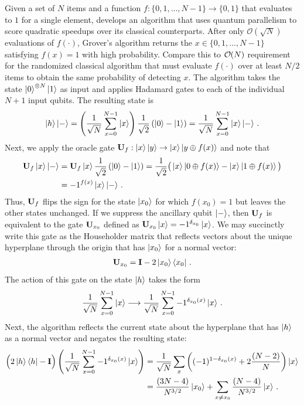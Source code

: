 \documentclass[12pt]{article} %
\newcommand{\order}[1]{{\cal O}\hspace{-0.2em}\left( #1 \right)}
\begin{document}
Given a set of $N$ items and a function $f:\{0,1,\dots,N-1\}\rightarrow \{0,1\}$ that evaluates to $1$ for a single element, \citet{grover1996fast} develops an algorithm that uses quantum parallelism to score quadratic speedups over its classical counterparts. After only $\mathcal{O}(\sqrt{N})$ evaluations of $f(\cdot)$, Grover's algorithm returns the $x\in \{0,1,\dots,N-1\}$ satisfying $f(x) =1$ with high probability.  Compare this to $\order{N}$ requirement for the randomized classical algorithm that must evaluate $f(\cdot)$ over at least $N/2$ items to obtain the same probability of detecting $x$.  The algorithm takes the state $\ket{0}^{\otimes N}\ket{1}$ as input and applies Hadamard gates to each of the individual $N+1$ input qubits.  The resulting state is 
\begin{align*}
\ket{h}\ket{-}= \left(\frac{1}{\sqrt{N}} \sum_{x=0}^{N-1} \ket{x} \right)  \frac{1}{\sqrt{2}}\left(\ket{0} -\ket{1}\right) =  \frac{1}{\sqrt{N}} \sum_{x=0}^{N-1} \ket{x} \ket{-} \, .
\end{align*}
Next, we apply the oracle gate $\mathbf{U}_f: \ket{x}\ket{y} \rightarrow \ket{x}\ket{y\oplus f(x)}$ and note that 
\begin{align*}
\mathbf{U}_f \ket{x} \ket{-} &= \mathbf{U}_f \ket{x} \frac{1}{\sqrt{2}}\left(\ket{0} -\ket{1}\right) 
= \frac{1}{\sqrt{2}} \big(\ket{x} \ket{0\oplus f(x)} - \ket{x}\ket{1\oplus f(x)} \big) \\
&= -1^{f(x)} \ket{x}\ket{-}  \, .
\end{align*}
Thus, $\mathbf{U}_f$ flips the sign for the state $\ket{x_0}$ for which $f(x_0)=1$ but leaves the other states unchanged.  If we suppress the ancillary qubit $\ket{-}$, then $\mathbf{U}_f$ is equivalent to the gate $\mathbf{U}_{x_0}$ defined as $\mathbf{U}_{x_0} \ket{x} = -1^{\delta_{x_0}}\ket{x}$. We may succinctly write this gate as the Householder matrix that reflects vectors about the unique hyperplane through the origin that has $\ket{x_0}$ for a normal vector:
\begin{align*}
\mathbf{U}_{x_0}= \mathbf{I} - 2 \ket{x_0}\bra{x_0} \, .
\end{align*}
The action of this gate on the state $\ket{h}$ takes the form
\begin{align*}
\frac{1}{\sqrt{N}} \sum_{x=0}^{N-1} \ket{x} \longrightarrow \frac{1}{\sqrt{N}} \sum_{x=0}^{N-1} -1^{\delta_{x_0}(x)} \ket{x} \, .
\end{align*}
Next, the algorithm reflects the current state about the hyperplane that has $\ket{h}$ as a normal vector and negates the resulting state:
\begin{align*}
\Big(2\ket{h}\bra{h}-\mathbf{I} \Big) \left( \frac{1}{\sqrt{N}} \sum_{x=0}^{N-1} -1^{\delta_{x_0}(x)} \ket{x}  \right)
&= \frac{1}{\sqrt{N}}\sum_{x} \left( (-1)^{1-\delta_{x_0}(x)} + 2 \frac{(N-2)}{N} \right)\ket{x}\\ &= \frac{(3N-4)}{N^{3/2}} \ket{x_0} + \sum_{x\neq x_0} \frac{(N-4)}{N^{3/2}}  \ket{x} \, .
\end{align*}
\end{document}
